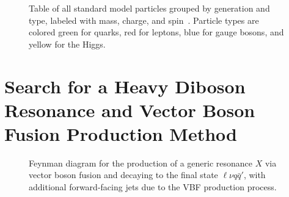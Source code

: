 
\begin{figure}[htbp]
  \centering
  
  \caption{Table of all standard model particles grouped by generation and type, labeled with mass, charge, and spin~\cite{PhysRevD.98.030001}. Particle types are colored green for quarks, red for leptons, blue for gauge bosons, and yellow for the Higgs.}
  \label{fig:standardModel}
\end{figure}

\section{Search for a Heavy Diboson Resonance and Vector Boson Fusion Production Method}
\label{sec:VBF}

\begin{figure}[htbp]
  \centering
  
  \caption{Feynman diagram for the production of a generic resonance $X$ via vector boson fusion and decaying to the final state $\ell\nu q\bar{q}'$, with additional forward-facing jets due to the VBF production process.}
  \label{fig:vbfFeynman}
\end{figure}
